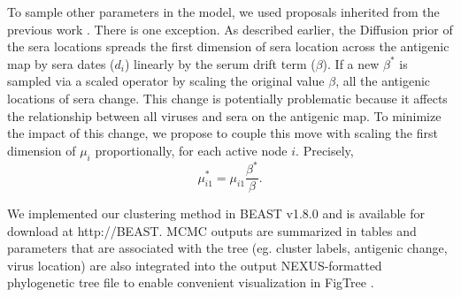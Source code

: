 \documentclass[11pt,oneside,letterpaper]{article}
\begin{document}
To sample other parameters in the model, we used proposals inherited from the previous work \cite{bedford_integrating_2014}. 
There is one exception.
As described earlier, the Diffusion prior of the sera locations \cite{bedford_integrating_2014} spreads the first dimension of sera location across the antigenic map by sera dates ($d_i$) linearly by the serum drift term ($\beta$).
If a new $\beta^{*}$ is sampled via a scaled operator \cite{bedford_integrating_2014} by scaling the original value $\beta$, all the antigenic locations of sera change.
This change is potentially problematic because it affects the relationship between all viruses and sera on the antigenic map.
To minimize the impact of this change, we propose to couple this move with scaling the first dimension of $\mu_i$  proportionally, for each active node $i$. Precisely, 
\begin{equation}
\label{scaleMu1}
 \mu_{i1}^* = \mu_{i1} \frac{ \beta^*}{\beta} .
\end{equation}



We implemented our clustering method in BEAST v1.8.0 and is available for download at http://BEAST.
MCMC outputs are summarized in tables and parameters that are associated with the tree (eg. cluster labels, antigenic change, virus location) are also integrated into the output NEXUS-formatted phylogenetic tree file to enable convenient visualization in FigTree \cite{FIGTREE}.








\end{document}
